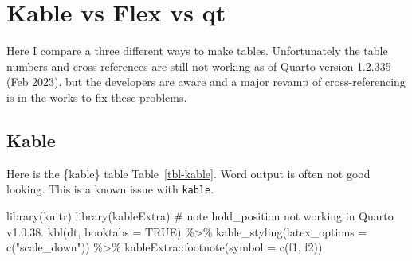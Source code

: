 \documentclass[
  letterpaper,
  oneside]{scrbook}
\newenvironment{Shaded}{\begin{snugshade}}{\end{snugshade}}
\newcommand{\AttributeTok}[1]{\textcolor[rgb]{0.40,0.45,0.13}{#1}}
\newcommand{\CommentTok}[1]{\textcolor[rgb]{0.37,0.37,0.37}{#1}}
\newcommand{\ConstantTok}[1]{\textcolor[rgb]{0.56,0.35,0.01}{#1}}
\newcommand{\FunctionTok}[1]{\textcolor[rgb]{0.28,0.35,0.67}{#1}}
\newcommand{\NormalTok}[1]{\textcolor[rgb]{0.00,0.23,0.31}{#1}}
\newcommand{\SpecialCharTok}[1]{\textcolor[rgb]{0.37,0.37,0.37}{#1}}
\newcommand{\StringTok}[1]{\textcolor[rgb]{0.13,0.47,0.30}{#1}}
\begin{document}

\hypertarget{sec-kableflexgt}{%
\chapter{Kable vs Flex vs qt}\label{sec-kableflexgt}}

Here I compare a three different ways to make tables. Unfortunately the
table numbers and cross-references are still not working as of Quarto
version 1.2.335 (Feb 2023), but the developers are aware and a major
revamp of cross-referencing is in the works to fix these problems.

\hypertarget{kable}{%
\section{Kable}\label{kable}}

Here is the \{kable\} table Table~\ref{tbl-kable}. Word output is often
not good looking. This is a known issue with \texttt{kable}.

\begin{Shaded}
\begin{Highlighting}[]
\FunctionTok{library}\NormalTok{(knitr)}
\FunctionTok{library}\NormalTok{(kableExtra)}
\CommentTok{\# note hold\_position not working in Quarto v1.0.38.}
\FunctionTok{kbl}\NormalTok{(dt, }\AttributeTok{booktabs =} \ConstantTok{TRUE}\NormalTok{) }\SpecialCharTok{\%\textgreater{}\%}
  \FunctionTok{kable\_styling}\NormalTok{(}\AttributeTok{latex\_options =} \FunctionTok{c}\NormalTok{(}\StringTok{"scale\_down"}\NormalTok{)) }\SpecialCharTok{\%\textgreater{}\%}
\NormalTok{  kableExtra}\SpecialCharTok{::}\FunctionTok{footnote}\NormalTok{(}\AttributeTok{symbol =} \FunctionTok{c}\NormalTok{(f1, f2))}
\end{Highlighting}
\end{Shaded}
\end{document}
